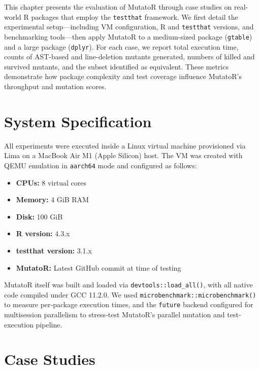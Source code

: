 
\begin{chapterabstract}
This chapter presents the evaluation of MutatoR through case studies on real-world R packages that employ the \texttt{testthat} framework. We first detail the experimental setup—including VM configuration, R and \texttt{testthat} versions, and benchmarking tools—then apply MutatoR to a medium-sized package (\texttt{gtable}) and a large package (\texttt{dplyr}). For each case, we report total execution time, counts of AST-based and line-deletion mutants generated, numbers of killed and survived mutants, and the subset identified as equivalent. These metrics demonstrate how package complexity and test coverage influence MutatoR’s throughput and mutation scores.

\end{chapterabstract}

\section{System Specification}

All experiments were executed inside a Linux virtual machine provisioned via Lima on a MacBook Air M1 (Apple Silicon) host.  The VM was created with QEMU emulation in \texttt{aarch64} mode and configured as follows:

\begin{itemize}
  \item \textbf{CPUs:} 8 virtual cores  
  \item \textbf{Memory:} 4 GiB RAM  
  \item \textbf{Disk:} 100 GiB  
  \item \textbf{R version:} 4.3.x  
  \item \textbf{testthat version:} 3.1.x \cite{wickham2011testthat}  
  \item \textbf{MutatoR:} Latest GitHub commit at time of testing  
\end{itemize}

MutatoR itself was built and loaded via \texttt{devtools::load\_all()}, with all native code compiled under GCC 11.2.0.  We used \texttt{microbenchmark::microbenchmark()} to measure per‐package execution times, and the \texttt{future} backend configured for multisession parallelism to stress‐test MutatoR’s parallel mutation and test‐execution pipeline.

\section{Case Studies}

